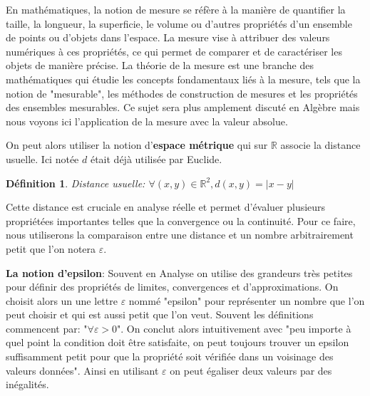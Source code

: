 \documentclass[a4paper, 12pt, french, twoside]{article}
\newtheorem{defi}[theorem]{Définition}
\newcommand{\Rr}{{\mathbb{R}}}
\begin{document}
\begin{tcolorbox}
    En mathématiques, la notion de mesure se réfère à la manière de quantifier la taille, la longueur, la superficie, le volume ou d'autres propriétés d'un ensemble de points ou d'objets dans l'espace. La mesure vise à attribuer des valeurs numériques à ces propriétés, ce qui permet de comparer et de caractériser les objets de manière précise. La théorie de la mesure est une branche des mathématiques qui étudie les concepts fondamentaux liés à la mesure, tels que la notion de "mesurable", les méthodes de construction de mesures et les propriétés des ensembles mesurables. Ce sujet sera plus amplement discuté en Algèbre mais nous voyons ici l'application de la mesure avec la valeur absolue.

    On peut alors utiliser la notion d'\textbf{espace métrique} qui sur $\Rr$ associe la distance usuelle. Ici notée $d$ était déjà utilisée par Euclide.
    \begin{defi} Distance usuelle:
        $\forall (x,y)\in\Rr ^2, d(x,y)=|x-y|$
    \end{defi}
    Cette distance est cruciale en analyse réelle et permet d'évaluer plusieurs propriétées importantes telles que la convergence ou la continuité. Pour ce faire, nous utiliserons la comparaison entre une distance et un nombre arbitrairement petit que l'on notera $\varepsilon$.
\end{tcolorbox}


\textbf{La notion d'epsilon}: 
Souvent en Analyse on utilise des grandeurs très petites pour définir des propriétés de limites, convergences et d'approximations. On choisit alors un une lettre $\varepsilon$ nommé "epsilon" pour représenter un nombre que l'on peut choisir et qui est aussi petit que l'on veut. Souvent les définitions commencent par: "$\forall \varepsilon>0$". On conclut alors intuitivement avec "peu importe à quel point la condition doit être satisfaite, on peut toujours trouver un epsilon suffisamment petit pour que la propriété soit vérifiée dans un voisinage des valeurs données". Ainsi en utilisant $\varepsilon$ on peut égaliser deux valeurs par des inégalités. 
\end{document}
